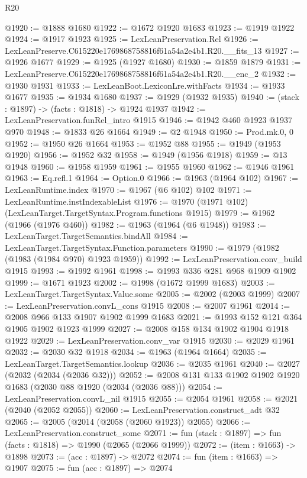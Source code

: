 \begin{lexlean}{R20}
\begin{coremodule}
@1920 := @1888 @1680
@1922 := @1672 @1920 @1683
@1923 := @1919 @1922
@1924 := @1917 @1923
@1925 := LexLeanPreservation.Rel
@1926 := LexLeanPreserve.C615220e1769868758816f61a54a2e4b1.R20.__fits_13
@1927 := @1926 @1677
@1929 := @1925 (@1927 @1680)
@1930 := @1859 @1879
@1931 := LexLeanPreserve.C615220e1769868758816f61a54a2e4b1.R20.__enc_2
@1932 := @1930 @1931
@1933 := LexLeanBoot.LexiconLre.withFacts
@1934 := @1933 @1677
@1935 := @1934 @1680
@1937 := @1929 (@1932 @1935)
@1940 := (stack : @1897) -> (facts : @1818) -> @1924 @1937
@1942 := LexLeanPreservation.funRel_intro @1915
@1946 := @1942 @460 @1923 @1937 @970
@1948 := @1833 @26 @1664
@1949 := @2 @1948
@1950 := Prod.mk.{0, 0}
@1952 := @1950 @26 @1664
@1953 := @1952 @88
@1955 := @1949 (@1953 @1920)
@1956 := @1952 @32
@1958 := @1949 (@1956 @1918)
@1959 := @13 @1948
@1960 := @1958 @1959
@1961 := @1955 @1960
@1962 := @1946 @1961
@1963 := Eq.refl.{1}
@1964 := Option.{0}
@1966 := @1963 (@1964 @102)
@1967 := LexLeanRuntime.index
@1970 := @1967 (@6 @102) @102
@1971 := LexLeanRuntime.instIndexableList
@1976 := @1970 (@1971 @102) (LexLeanTarget.TargetSyntax.Program.functions @1915)
@1979 := @1962 (@1966 (@1976 @460))
@1982 := @1963 (@1964 (@6 @1948))
@1983 := LexLeanTarget.TargetSemantics.bindAll
@1984 := LexLeanTarget.TargetSyntax.Function.parameters
@1990 := @1979 (@1982 (@1983 (@1984 @970) @1923 @1959))
@1992 := LexLeanPreservation.conv_build @1915
@1993 := @1992 @1961
@1998 := @1993 @336 @281 @968 @1909 @1902
@1999 := @1671 @1923
@2002 := @1998 (@1672 @1999 @1683)
@2003 := LexLeanTarget.TargetSyntax.Value.some
@2005 := @2002 (@2003 @1999)
@2007 := LexLeanPreservation.convL_cons @1915
@2008 := @2007 @1961
@2014 := @2008 @966 @133 @1907 @1902 @1999 @1683
@2021 := @1993 @152 @121 @364 @1905 @1902 @1923 @1999
@2027 := @2008 @158 @134 @1902 @1904 @1918 @1922
@2029 := LexLeanPreservation.conv_var @1915
@2030 := @2029 @1961
@2032 := @2030 @32 @1918
@2034 := @1963 (@1964 @1664)
@2035 := LexLeanTarget.TargetSemantics.lookup
@2036 := @2035 @1961
@2040 := @2027 (@2032 (@2034 (@2036 @32)))
@2052 := @2008 @131 @133 @1902 @1902 @1920 @1683 (@2030 @88 @1920 (@2034 (@2036 @88)))
@2054 := LexLeanPreservation.convL_nil @1915
@2055 := @2054 @1961
@2058 := @2021 (@2040 (@2052 @2055))
@2060 := LexLeanPreservation.construct_adt @32
@2065 := @2005 (@2014 (@2058 (@2060 @1923)) @2055)
@2066 := LexLeanPreservation.construct_some
@2071 := fun (stack : @1897) => fun (facts : @1818) => @1990 (@2065 (@2066 @1999))
@2072 := (item : @1663) -> @1898
@2073 := (acc : @1897) -> @2072
@2074 := fun (item : @1663) => @1907
@2075 := fun (acc : @1897) => @2074

\end{coremodule}
\end{lexlean}
